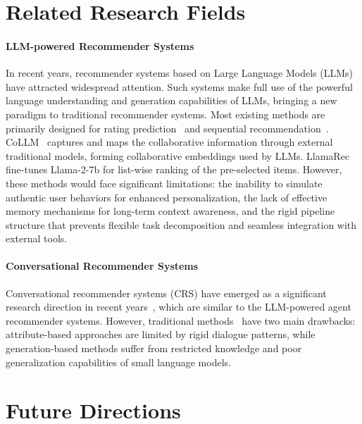\section{Related Research Fields}

\paragraph{LLM-powered Recommender Systems} In recent years, recommender systems based on Large Language Models (LLMs) have attracted widespread attention. 
Such systems make full use of the powerful language understanding and generation capabilities of LLMs, bringing a new paradigm to traditional recommender systems.
Most existing methods are primarily designed for rating prediction~\cite{bao2023tallrec} and sequential recommendation~\cite{hou2024large,shao2024ulmrec,zheng2024adapting}.
CoLLM~\cite{zhang2023collm} captures and maps the collaborative information through external traditional models, forming collaborative embeddings used by LLMs. 
LlamaRec~\cite{llamarec} fine-tunes Llama-2-7b for list-wise ranking of the pre-selected items.
However, these methods would face significant limitations: the inability to simulate authentic user behaviors for enhanced personalization, the lack of effective memory mechanisms for long-term context awareness, and the rigid pipeline structure that prevents flexible task decomposition and seamless integration with external tools.

\paragraph{Conversational Recommender Systems}

Conversational recommender systems (CRS) have emerged as a significant research direction in recent years~\cite{jannach2021survey}, which are similar to the LLM-powered agent recommender systems. 
However, traditional methods~\cite{lei2020interactive} have two main drawbacks: attribute-based approaches are limited by rigid dialogue patterns, while generation-based methods suffer from restricted knowledge and poor generalization capabilities of small language models.


\section{Future Directions}

